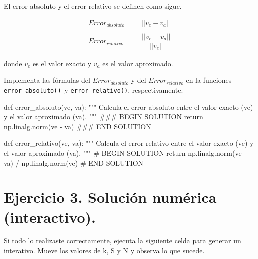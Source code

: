 \documentclass[
  letterpaper,
  DIV=11,
  numbers=noendperiod]{scrreprt}
\newenvironment{Shaded}{\begin{snugshade}}{\end{snugshade}}
\newcommand{\CommentTok}[1]{\textcolor[rgb]{0.37,0.37,0.37}{#1}}
\newcommand{\ControlFlowTok}[1]{\textcolor[rgb]{0.00,0.23,0.31}{#1}}
\newcommand{\KeywordTok}[1]{\textcolor[rgb]{0.00,0.23,0.31}{#1}}
\newcommand{\NormalTok}[1]{\textcolor[rgb]{0.00,0.23,0.31}{#1}}
\newcommand{\OperatorTok}[1]{\textcolor[rgb]{0.37,0.37,0.37}{#1}}
\newcommand{\RegionMarkerTok}[1]{\textcolor[rgb]{0.00,0.23,0.31}{#1}}
\begin{document}
El error absoluto y el error relativo se definen como sigue.

\[
\begin{eqnarray*}
Error_{absoluto} & = & ||v_e - v_a|| \\ \\
Error_{relativo} & = & \dfrac{||v_e - v_a||}{||v_e||}
\end{eqnarray*}
\]

donde \(v_e\) es el valor exacto y \(v_a\) es el valor aproximado.

Implementa las fórmulas del \(Error_{absoluto}\) y del
\(Error_{relativo}\) en la funciones \texttt{error\_absoluto()}~y
\texttt{error\_relativo()}, respectivamente.

\begin{Shaded}
\begin{Highlighting}[]
\KeywordTok{def}\NormalTok{ error\_absoluto(ve, va):}
    \CommentTok{"""}
\CommentTok{    Calcula el error absoluto entre el valor exacto (ve) y el valor aproximado (va).}
\CommentTok{    """}
    \CommentTok{\#\#\# }\RegionMarkerTok{BEGIN}\CommentTok{ SOLUTION}
    \ControlFlowTok{return}\NormalTok{ np.linalg.norm(ve }\OperatorTok{{-}}\NormalTok{ va)}
    \CommentTok{\#\#\# }\RegionMarkerTok{END}\CommentTok{ SOLUTION}
\end{Highlighting}
\end{Shaded}

\begin{Shaded}
\begin{Highlighting}[]
\KeywordTok{def}\NormalTok{ error\_relativo(ve, va):}
    \CommentTok{"""}
\CommentTok{    Calcula el error relativo entre el valor exacto (ve) y el valor aproximado (va).}
\CommentTok{    """}
    \CommentTok{\# }\RegionMarkerTok{BEGIN}\CommentTok{ SOLUTION}
    \ControlFlowTok{return}\NormalTok{ np.linalg.norm(ve }\OperatorTok{{-}}\NormalTok{ va) }\OperatorTok{/}\NormalTok{ np.linalg.norm(ve)}
    \CommentTok{\# }\RegionMarkerTok{END}\CommentTok{ SOLUTION}
\end{Highlighting}
\end{Shaded}

\section{Ejercicio 3. Solución numérica
(interactivo).}\label{ejercicio-3.-soluciuxf3n-numuxe9rica-interactivo.}

Si todo lo realizaste correctamente, ejecuta la siguiente celda para
generar un interativo. Mueve los valores de k, S y N y observa lo que
sucede.
\end{document}

